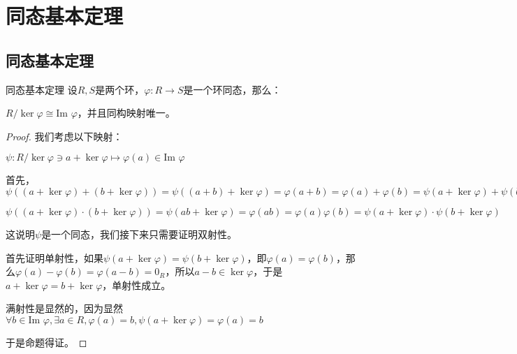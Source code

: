 \documentclass[12pt, a4paper, oneside, UTF8]{ctexbook}
\begin{document}
	\section{同态基本定理}
		\subsection{同态基本定理}
			\begin{them}{同态基本定理}{}
				设$R,S$是两个环，$\varphi : R \rightarrow S$是一个环同态，那么：

				$R / \ker \varphi \cong \text{Im }\varphi $，并且同构映射唯一。
			\end{them}
			\begin{proof}
				我们考虑以下映射：

				$\psi : R / \ker \varphi \ni a+\ker \varphi  \mapsto \varphi (a) \in \text{Im }\varphi $

				首先，$\psi \left((a+\ker \varphi )+(b+\ker \varphi )\right)=\psi \left((a+b)+\ker \varphi \right)=\varphi (a+b)=\varphi (a)+\varphi (b)=\psi (a+\ker \varphi )+\psi (b+\ker \varphi )$
				
				$\psi \left((a+\ker \varphi )\cdot (b+\ker \varphi )\right)=\psi (ab+\ker \varphi )=\varphi (ab)=\varphi (a)\varphi (b)=\psi (a+\ker \varphi )\cdot \psi (b+\ker \varphi )$

				这说明$\psi $是一个同态，我们接下来只需要证明双射性。

				首先证明单射性，如果$\psi (a+\ker \varphi )=\psi (b+\ker \varphi )$，即$\varphi (a)=\varphi (b)$，那么$\varphi (a)-\varphi (b)=\varphi (a-b)=0_R$，所以$a-b \in \ker \varphi $，于是$a+\ker \varphi =b+\ker \varphi $，单射性成立。

				满射性是显然的，因为显然$\forall b \in \text{Im }\varphi ,\exists a \in R,\varphi (a)=b,\psi (a+\ker \varphi )=\varphi (a)=b$

				于是命题得证。
			\end{proof}
\end{document}
